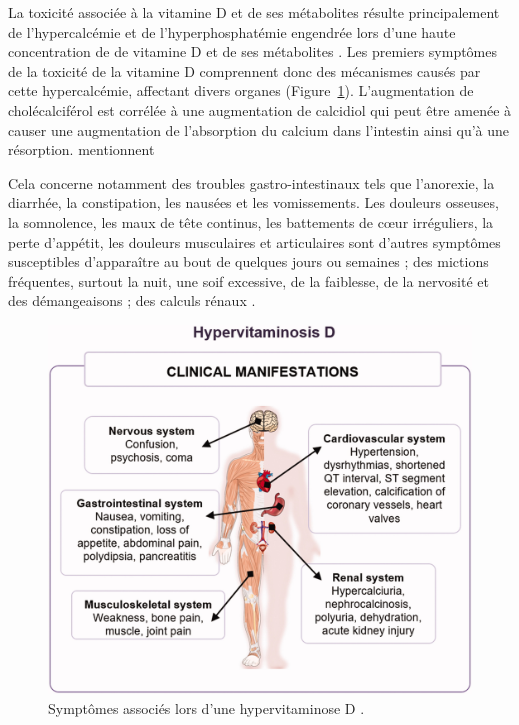 \documentclass[
  a4paper,
  DIV=11,
  numbers=noendperiod,
  listof=totoc]{scrreprt}
\begin{document}
La toxicité associée à la vitamine D et de ses métabolites résulte
principalement de l'hypercalcémie et de l'hyperphosphatémie engendrée
lors d'une haute concentration de de vitamine D et de ses métabolites
\autocites[ ]{DeLuca.2011}{Janoušek.2022}. Les premiers symptômes de la
toxicité de la vitamine D comprennent donc des mécanismes causés par
cette hypercalcémie, affectant divers organes
(Figure~\ref{fig-hypervitaminose-d}). L'augmentation de cholécalciférol
est corrélée à une augmentation de calcidiol qui peut être amenée à
causer une augmentation de l'absorption du calcium dans l'intestin ainsi
qu'à une résorption. \textcite{Janoušek.2022} mentionnent

Cela concerne notamment des troubles gastro-intestinaux tels que
l'anorexie, la diarrhée, la constipation, les nausées et les
vomissements. Les douleurs osseuses, la somnolence, les maux de tête
continus, les battements de cœur irréguliers, la perte d'appétit, les
douleurs musculaires et articulaires sont d'autres symptômes
susceptibles d'apparaître au bout de quelques jours ou semaines ; des
mictions fréquentes, surtout la nuit, une soif excessive, de la
faiblesse, de la nervosité et des démangeaisons ; des calculs rénaux
\autocite{Alshahrani.2013}.

\begin{figure}

{\centering \includegraphics{figures/hypervitaminosis-d.jpg}

}

\caption[Symptômes associés lors d'une hypervitaminose
D.]{\label{fig-hypervitaminose-d}Symptômes associés lors d'une
hypervitaminose D \autocite{Janoušek.2022}.}

\end{figure}
\end{document}
